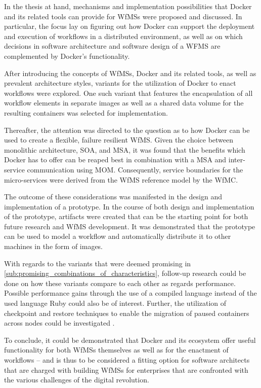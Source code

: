 
In the thesis at hand, mechanisms and implementation possibilities that Docker and its related tools can provide for \acp{WfMS} were proposed and discussed. In particular, the focus lay on figuring out how Docker can support the deployment and execution of workflows in a distributed environment, as well as on which decisions in software architecture and software design of a WFMS are complemented by Docker's functionality.

After introducing the concepts of \acp{WfMS}, Docker and its related tools, as well as prevalent architecture styles, variants for the utilization of Docker to enact workflows were explored. One such variant that features the encapsulation of all workflow elements in separate images as well as a shared data volume for the resulting containers was selected for implementation.

Thereafter, the attention was directed to the question as to how Docker can be used to create a flexible, failure resilient \ac{WfMS}. Given the choice between monolithic architecture, \ac{SOA}, and \ac{MSA}, it was found that the benefits which Docker has to offer can be reaped best in combination with a \ac{MSA} and inter-service communication using \ac{MOM}. Consequently, service boundaries for the micro-services were derived from the \ac{WfMS} reference model by the \ac{WfMC}.

The outcome of these considerations was manifested in the design and implementation of a prototype. In the course of both design and implementation of the prototype, artifacts were created that can be the starting point for both future research and \ac{WfMS} development. It was demonstrated that the prototype can be used to model a workflow and automatically distribute it to other machines in the form of images.

With regards to the variants that were deemed promising in \ref{sub:promising_combinations_of_characteristics}, follow-up research could be done on how these variants compare to each other as regards performance. Possible performance gains through the use of a compiled language instead of the used language Ruby could also be of interest. Further, the utilization of checkpoint and restore techniques to enable the migration of paused containers across nodes could be investigated \cite{Kim2015Checkpoint,Merker2015How}.

To conclude, it could be demonstrated that Docker and its ecosystem offer useful functionality for both \acp{WfMS} themselves as well as for the enactment of workflows – and is thus to be considered a fitting option for software architects that are charged with building \acp{WfMS} for enterprises that are confronted with the various challenges of the digital revolution.
